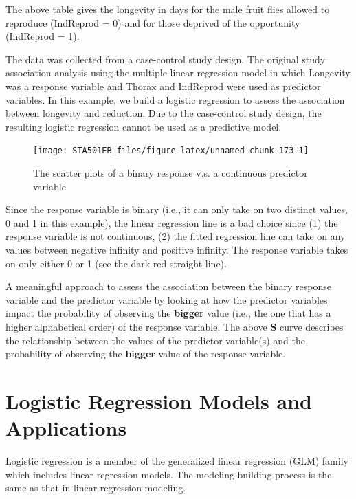 \documentclass[
]{book}
\begin{document}
The above table gives the longevity in days for the male fruit flies allowed to reproduce (IndReprod = 0) and for those deprived of the opportunity (IndReprod = 1).

The data was collected from a case-control study design. The original study association analysis using the multiple linear regression model in which Longevity was a response variable and Thorax and IndReprod were used as predictor variables. In this example, we build a logistic regression to assess the association between longevity and reduction. Due to the case-control study design, the resulting logistic regression cannot be used as a predictive model.

\begin{figure}

{\centering \texttt{[image: STA501EB\_files/figure-latex/unnamed-chunk-173-1]} 

}

\caption{The scatter plots of a binary response v.s. a continuous predictor variable}\label{fig:unnamed-chunk-173}
\end{figure}

Since the response variable is binary (i.e., it can only take on two distinct values, 0 and 1 in this example), the linear regression line is a bad choice since (1) the response variable is not continuous, (2) the fitted regression line can take on any values between negative infinity and positive infinity. The response variable takes on only either 0 or 1 (see the dark red straight line).

A meaningful approach to assess the association between the binary response variable and the predictor variable by looking at how the predictor variables impact the probability of observing the \textbf{bigger} value (i.e., the one that has a higher alphabetical order) of the response variable. The above \textbf{S} curve describes the relationship between the values of the predictor variable(s) and the probability of observing the \textbf{bigger} value of the response variable.

\hypertarget{logistic-regression-models-and-applications}{%
\section{Logistic Regression Models and Applications}\label{logistic-regression-models-and-applications}}

Logistic regression is a member of the generalized linear regression (GLM) family which includes linear regression models. The modeling-building process is the same as that in linear regression modeling.
\end{document}
